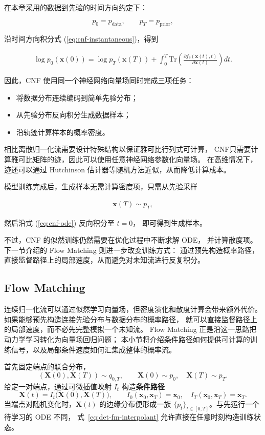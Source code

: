 \documentclass[UTF8,a4paper,zihao=-4,oneside,openany]{ctexbook}
\begin{document}
在本章采用的数据到先验的时间方向约定下：

\[
p_0=p_{\mathrm{data}},
\qquad
p_T=p_{\mathrm{prior}},
\]

沿时间方向积分式
(\ref{eq:cnf-instantaneous})，得到

\begin{eqnarray}
\log p_0(\mathbf{x}(0))
=
\log p_T(\mathbf{x}(T))
+
\int_0^T
\mathrm{Tr}
\left(
\frac{\partial f_{\theta}(\mathbf{x}(t),t)}
{\partial\mathbf{x}(t)}
\right)
dt .
\label{eq:cnf-likelihood}
\end{eqnarray}

因此，CNF 使用同一个神经网络向量场同时完成三项任务：

\begin{itemize}
\item 将数据分布连续编码到简单先验分布；
\item 从先验分布反向积分生成数据样本；
\item 沿轨迹计算样本的概率密度。
\end{itemize}

相比离散归一化流需要设计特殊结构以保证雅可比行列式可计算，
CNF只需要计算雅可比矩阵的迹，因此可以使用任意神经网络参数化向量场。
在高维情况下，迹还可以通过 Hutchinson 估计器等随机方法近似，从而降低计算成本。

模型训练完成后，生成样本无需计算密度项，只需从先验采样

\begin{eqnarray}
\mathbf{x}(T)\sim p_T,
\end{eqnarray}

然后沿式 (\ref{eq:cnf-ode}) 反向积分至 $t=0$，
即可得到生成样本。

不过，CNF 的似然训练仍然需要在优化过程中不断求解 ODE，
并计算散度项。下一节介绍的 Flow Matching 则进一步改变训练方式：
通过预先构造概率路径，直接监督路径上的局部速度，从而避免对未知流进行反复积分。


\subsection{Flow Matching}

连续归一化流可以通过似然学习向量场，但密度演化和散度计算会带来额外代价。
如果能够预先构造连接先验分布与数据分布的概率路径，
就可以直接监督路径上的局部速度，而不必先完整模拟一个未知流。
Flow Matching 正是沿这一思路把动力学学习转化为向量场回归问题；
本小节将介绍条件路径如何提供可计算的训练信号，以及局部条件速度如何汇集成整体的概率流。

首先固定端点的联合分布，
\[
    (\mathbf{X}(0),\mathbf{X}(T))
    \sim q_{0,T},
    \qquad
    \mathbf{X}(0)\sim p_0,
    \quad
    \mathbf{X}(T)\sim p_T.
\]
给定一对端点，通过可微插值映射
\(I_t\) 构造\textbf{条件路径}
\begin{equation}
    \mathbf{X}(t)
    =
    I_t\bigl(\mathbf{X}(0),\mathbf{X}(T)\bigr),
    \qquad
    I_0(\mathbf{x}_0,\mathbf{x}_T)=\mathbf{x}_0,
    \quad
    I_T(\mathbf{x}_0,\mathbf{x}_T)=\mathbf{x}_T.
    \label{eq:det-fm-interpolant}
\end{equation}
当端点对随机变化时，\(\mathbf{X}(t)\) 的边缘分布便形成一族
\(\{p_t\}_{t\in[0,T]}\)。与先运行一个待学习的 ODE 不同，
式~\eqref{eq:det-fm-interpolant} 允许直接在任意时刻构造训练状态。
\end{document}
